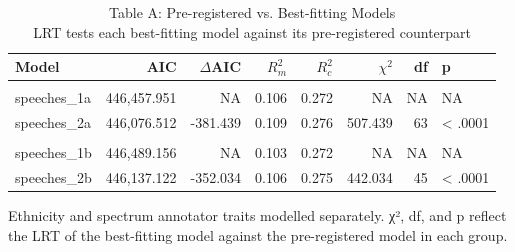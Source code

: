 \begin{table}[t]
\caption*{
{\large Table A: Pre-registered vs. Best-fitting Models} \\ 
{\small LRT tests each best-fitting model against its pre-registered counterpart}
} 
\fontsize{12.0pt}{14.4pt}\selectfont
\begin{tabular*}{\linewidth}{@{\extracolsep{\fill}}lrrrrrrl}
\toprule
Model & AIC & $\Delta$AIC & $R^2_m$ & $R^2_c$ & $\chi^2$ & df & p \\ 
\midrule\addlinespace[2.5pt]
\multicolumn{8}{l}{Ethnicity Models} \\[2.5pt] 
\midrule\addlinespace[2.5pt]
speeches\_1a & 446,457.951 & NA & 0.106 & 0.272 & NA & NA & NA \\ 
speeches\_2a & 446,076.512 & -381.439 & 0.109 & 0.276 & 507.439 & 63 & < .0001 \\ 
\midrule\addlinespace[2.5pt]
\multicolumn{8}{l}{Spectrum Models} \\[2.5pt] 
\midrule\addlinespace[2.5pt]
speeches\_1b & 446,489.156 & NA & 0.103 & 0.272 & NA & NA & NA \\ 
speeches\_2b & 446,137.122 & -352.034 & 0.106 & 0.275 & 442.034 & 45 & < .0001 \\ 
\bottomrule
\end{tabular*}
\begin{minipage}{\linewidth}
Ethnicity and spectrum annotator traits modelled separately. χ², df, and p reflect the LRT of the best-fitting model against the pre-registered model in each group.\\
\end{minipage}
\end{table}


